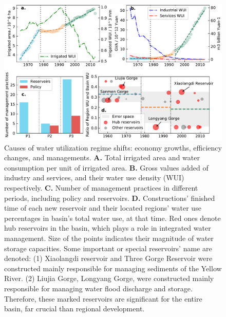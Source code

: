 \documentclass[9pt, twocolumn, twoside, lineno]{pnas-new}
\begin{document}
\begin{figure}%
	\centering
	\includegraphics[width=\linewidth]{../../figures/main_text/causes.pdf}
	\caption{
		Causes of water utilization regime shifts: economy growths, efficiency changes, and managements.
		\textbf{A.} Total irrigated area and water consumption per unit of irrigated area.
		\textbf{B.} Gross values added of industry and services, and their water use density (WUI) respectively.
		\textbf{C.} Number of management practices in different periods, including policy and reservoirs.
		\textbf{D.} Constructions' finished time of each new reservoir and their located regions' water use percentages in basin's total water use, at that time. Red ones denote hub reservoirs in the basin, which plays a role in integrated water management. Size of the points indicates their magnitude of water storage capacities. Some important or special reservoirs' name are denoted: (1) Xiaolangdi reservoir and Three Gorge Reservoir were constructed mainly responsible for managing sediments of the Yellow River. (2) Liujia Gorge, Longyang Gorge, were constructed mainly responsible for managing water flood discharge and storage. Therefore, these marked reservoirs are significant for the entire basin, far crucial than regional development.
	}
	\label{fig:Causes}
\end{figure}
\end{document}
